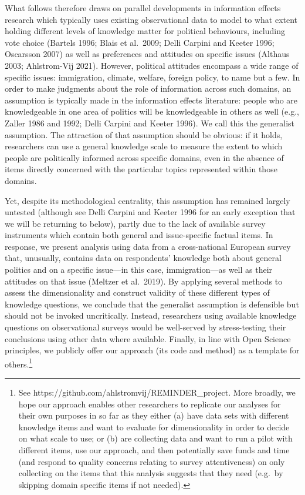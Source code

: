 \documentclass[12pt,halfline,a4paper,]{ouparticle}
\begin{document}
What follows therefore draws on parallel developments in information
effects research which typically uses existing observational data to
model to what extent holding different levels of knowledge matter for
political behaviours, including vote choice (Bartels 1996; Blais et
al.~2009; Delli Carpini and Keeter 1996; Oscarsson 2007) as well as
preferences and attitudes on specific issues (Althaus 2003; Ahlstrom-Vij
2021). However, political attitudes encompass a wide range of specific
issues: immigration, climate, welfare, foreign policy, to name but a
few. In order to make judgments about the role of information across
such domains, an assumption is typically made in the information effects
literature: people who are knowledgeable in one area of politics will be
knowledgeable in others as well (e.g., Zaller 1986 and 1992; Delli
Carpini and Keeter 1996). We call this the generalist assumption. The
attraction of that assumption should be obvious: if it holds,
researchers can use a general knowledge scale to measure the extent to
which people are politically informed across specific domains, even in
the absence of items directly concerned with the particular topics
represented within those domains.

Yet, despite its methodological centrality, this assumption has remained
largely untested (although see Delli Carpini and Keeter 1996 for an
early exception that we will be returning to below), partly due to the
lack of available survey instruments which contain both general and
issue-specific factual items. In response, we present analysis using
data from a cross-national European survey that, unusually, contains
data on respondents' knowledge both about general politics and on a
specific issue---in this case, immigration---as well as their attitudes
on that issue (Meltzer et al.~2019). By applying several methods to
assess the dimensionality and construct validity of these different
types of knowledge questions, we conclude that the generalist assumption
is defensible but should not be invoked uncritically. Instead,
researchers using available knowledge questions on observational surveys
would be well-served by stress-testing their conclusions using other
data where available. Finally, in line with Open Science principles, we
publicly offer our approach (its code and method) as a template for
others.\footnote{See https://github.com/ahlstromvij/REMINDER\_project.
  More broadly, we hope our approach enables other researchers to
  replicate our analyses for their own purposes in so far as they either
  (a) have data sets with different knowledge items and want to evaluate
  for dimensionality in order to decide on what scale to use; or (b) are
  collecting data and want to run a pilot with different items, use our
  approach, and then potentially save funds and time (and respond to
  quality concerns relating to survey attentiveness) on only collecting
  on the items that this analysis suggests that they need (e.g.~by
  skipping domain specific items if not needed).}
\end{document}
